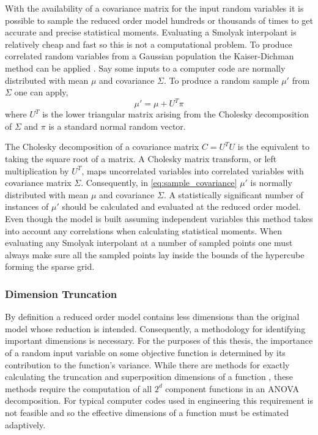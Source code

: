 With the availability of a covariance matrix for the input random variables it is possible to sample the reduced order model hundreds or thousands of times to get accurate and precise statistical moments. Evaluating a Smolyak interpolant is relatively cheap and fast so this is not a computational problem. To produce correlated  random variables from a Gaussian population the Kaiser-Dichman method can be applied \cite{KaiserDichman}. Say some inputs to a computer code are normally distributed with mean $\mu$ and covariance $\Sigma$. To produce a random sample $\mu'$ from $\Sigma$ one can apply,
\begin{equation} \label{eq:sample_covariance}
   \mu' = \mu + U^T\pi
\end{equation} 
where $U^T$ is the lower triangular matrix arising from the Cholesky decomposition of $\Sigma$ and $\pi$ is a standard normal random vector. 

The Cholesky decomposition of a covariance matrix $C=U^{T}U$ is the equivalent to taking the square root of a matrix. A Cholesky matrix transform, or left multiplication by $U^T$, maps uncorrelated variables into correlated variables with covariance matrix $\Sigma$. Consequently, in \ref{eq:sample_covariance} $\mu'$ is normally distributed with mean $\mu$ and covariance $\Sigma$. A statistically significant number of instances of $\mu'$ should be calculated and evaluated at the reduced order model. Even though the model is built assuming independent variables this method takes into account any correlations when calculating statistical moments. When evaluating any Smolyak interpolant at a number of sampled points one must always make sure all the sampled points lay inside the bounds of the hypercube forming the sparse grid.

\subsubsection{Dimension Truncation} \label{subsubsec:dimension_truncation}

By definition a reduced order model contains less dimensions than the original model whose reduction is intended. Consequently, a methodology for identifying important dimensions is necessary. For the purposes of this thesis, the importance of a random input variable on some objective function is determined by its contribution to the function's variance. While there are methods for exactly calculating the truncation and superposition dimensions of a function \cite{Holtz}, these methods require the computation of all $2^d$ component functions in an \ac{ANOVA} decomposition. For typical computer codes used in engineering this requirement is not feasible and so the effective dimensions of a function must be estimated adaptively. 

